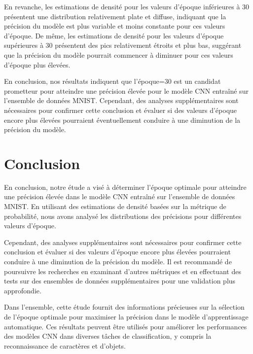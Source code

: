 En revanche, les estimations de densité pour les valeurs d'époque inférieures à 30 présentent une distribution relativement plate et diffuse, indiquant que la précision du modèle est plus variable et moins constante pour ces valeurs d'époque. De même, les estimations de densité pour les valeurs d'époque supérieures à 30 présentent des pics relativement étroits et plus bas, suggérant que la précision du modèle pourrait commencer à diminuer pour ces valeurs d'époque plus élevées.

En conclusion, nos résultats indiquent que l'époque=30 est un candidat prometteur pour atteindre une précision élevée pour le modèle CNN entraîné sur l'ensemble de données MNIST. Cependant, des analyses supplémentaires sont nécessaires pour confirmer cette conclusion et évaluer si des valeurs d'époque encore plus élevées pourraient éventuellement conduire à une diminution de la précision du modèle.
\newpage
\section{Conclusion}
En conclusion, notre étude a visé à déterminer l'époque optimale pour atteindre une précision élevée dans le modèle CNN entraîné sur l'ensemble de données MNIST. En utilisant des estimations de densité basées sur la métrique de probabilité, nous avons analysé les distributions des précisions pour différentes valeurs d'époque.

Cependant, des analyses supplémentaires sont nécessaires pour confirmer cette conclusion et évaluer si des valeurs d'époque encore plus élevées pourraient conduire à une diminution de la précision du modèle. Il est recommandé de poursuivre les recherches en examinant d'autres métriques et en effectuant des tests sur des ensembles de données supplémentaires pour une validation plus approfondie.

Dans l'ensemble, cette étude fournit des informations précieuses sur la sélection de l'époque optimale pour maximiser la précision dans le modèle d'apprentissage automatique. Ces résultats peuvent être utilisés pour améliorer les performances des modèles CNN dans diverses tâches de classification, y compris la reconnaissance de caractères et d'objets.
\newpage
\thispagestyle{empty}
\null\newpage






